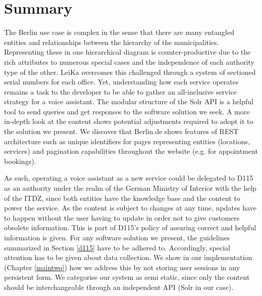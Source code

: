 


\section{Summary}
The Berlin use case is complex in the sense that there are many entangled entities and relationships between the hierarchy of the municipalities. Representing these in one hierarchical diagram is counter-productive due to the rich attributes to numerous special cases and the independence of each authority type of the other. LeiKa overcomes this challenged through a system of sectioned serial numbers for each office. Yet, understanding how each service operates remains a task to the developer to be able to gather an all-inclusive service strategy for a voice assistant. The modular structure of the Solr API is a helpful tool to send queries and get responses to the software solution we seek. A more in-depth look at the content shows potential adjustments required to adopt it to the solution we present.
We discover that Berlin.de shows features of REST architecture such as unique identifiers for pages representing entities (locations, services) and pagination capabilities throughout the website (e.g. for appointment bookings).

As such, operating a voice assistant as a new service could be delegated to D115 as an authority under the realm of the German Ministry of Interior with the help of the ITDZ, since both entities have the knowledge base and the content to power the service. As the content is subject to changes at any time, updates have to happen without the user having to update in order not to give customers obsolete information. This is part of D115's policy of assuring correct and helpful information is given. For any software solution we present, the guidelines summarized in Section \ref{d115} have to be adhered to. Accordingly, special attention has to be given about data collection. We show in our implementation (Chapter \ref{maintwo}) how we address this by not storing user sessions in any persistent form.
We categorise our system as semi static, since only the content should be interchangeable through an independent API (Solr in our case). 

